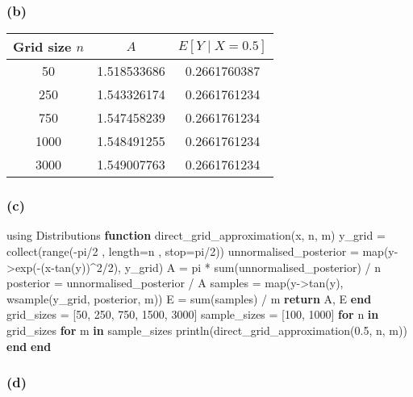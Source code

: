 \documentclass[]{article}
\newenvironment{Shaded}{\begin{snugshade}}{\end{snugshade}}
\newcommand{\KeywordTok}[1]{\textcolor[rgb]{0.13,0.29,0.53}{\textbf{#1}}}
\newcommand{\FloatTok}[1]{\textcolor[rgb]{0.00,0.00,0.81}{#1}}
\newcommand{\NormalTok}[1]{#1}
\begin{document}
\subsubsection{(b)}\label{b}

\begin{longtable}[]{@{}ccc@{}}
\toprule
Grid size \(n\) & \(A\) & \(E[Y\mid X=0.5]\)\tabularnewline
\midrule
\endhead
50 & 1.518533686 & 0.2661760387\tabularnewline
250 & 1.543326174 & 0.2661761234\tabularnewline
750 & 1.547458239 & 0.2661761234\tabularnewline
1000 & 1.548491255 & 0.2661761234\tabularnewline
3000 & 1.549007763 & 0.2661761234\tabularnewline
\bottomrule
\end{longtable}

\subsubsection{(c)}\label{c}

\begin{Shaded}
\begin{Highlighting}[]
\NormalTok{using Distributions}
\KeywordTok{function}\NormalTok{ direct_grid_approximation(x, n, m)}
\NormalTok{  y_grid = collect(range(-pi/}\FloatTok{2}\NormalTok{ , length=n , stop=pi/}\FloatTok{2}\NormalTok{))}
\NormalTok{  unnormalised_posterior = map(y->exp(-(x-tan(y))^}\FloatTok{2}\NormalTok{/}\FloatTok{2}\NormalTok{), y_grid)}
\NormalTok{  A = pi * sum(unnormalised_posterior) / n}
\NormalTok{  posterior = unnormalised_posterior / A}
\NormalTok{  samples = map(y->tan(y), wsample(y_grid, posterior, m))}
\NormalTok{  E = sum(samples) / m}
  \KeywordTok{return}\NormalTok{ A, E}
\KeywordTok{end}
\NormalTok{grid_sizes = [}\FloatTok{50}\NormalTok{, }\FloatTok{250}\NormalTok{, }\FloatTok{750}\NormalTok{, }\FloatTok{1500}\NormalTok{, }\FloatTok{3000}\NormalTok{]}
\NormalTok{sample_sizes = [}\FloatTok{100}\NormalTok{, }\FloatTok{1000}\NormalTok{]}
\KeywordTok{for}\NormalTok{ n }\KeywordTok{in}\NormalTok{ grid_sizes}
  \KeywordTok{for}\NormalTok{ m }\KeywordTok{in}\NormalTok{ sample_sizes}
\NormalTok{    println(direct_grid_approximation(}\FloatTok{0.5}\NormalTok{, n, m))}
  \KeywordTok{end}
\KeywordTok{end}
\end{Highlighting}
\end{Shaded}

\subsubsection{(d)}\label{d}
\end{document}
